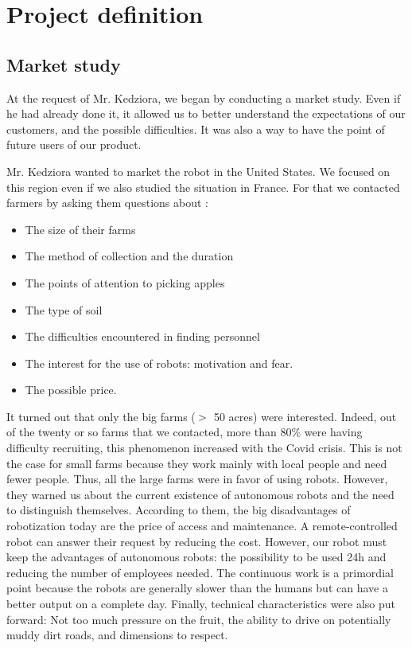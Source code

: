 \section{Project definition}\insertloftspace
\setcounter{figure}{0}\setcounter{table}{0}

\subsection{Market study}

At the request of Mr. Kedziora, we began by conducting a market study. Even if he had already done it, it allowed us to better understand the expectations of our customers, and the possible difficulties. It was also a way to have the point of future users of our product.

\bigbreak
Mr. Kedziora wanted to market the robot in the United States. We focused on this region even if we also studied the situation in France. For that we contacted farmers by asking them questions about : 
\begin{itemize}[noitemsep]
    \item The size of their farms
    \item The method of collection and the duration
    \item The points of attention to picking apples
    \item The type of soil
    \item The difficulties encountered in finding personnel
    \item The interest for the use of robots: motivation and fear.
    \item The possible price.
\end{itemize}

It turned out that only the big farms ($\bg$ 50 acres) were interested. Indeed, out of the twenty or so farms that we contacted, more than 80\% were having difficulty recruiting, this phenomenon increased with the Covid crisis. This is not the case for small farms because they work mainly with local people and need fewer people. Thus, all the large farms were in favor of using robots. However, they warned us about the current existence of autonomous robots and the need to distinguish themselves. According to them, the big disadvantages of robotization today are the price of access and maintenance. A remote-controlled robot can answer their request by reducing the cost. However, our robot must keep the advantages of autonomous robots: the possibility to be used 24h and reducing the number of employees needed. The continuous work is a primordial point because the robots are generally slower than the humans but can have a better output on a complete day. Finally, technical characteristics were also put forward: Not too much pressure on the fruit, the ability to drive on potentially muddy dirt roads, and dimensions to respect.

